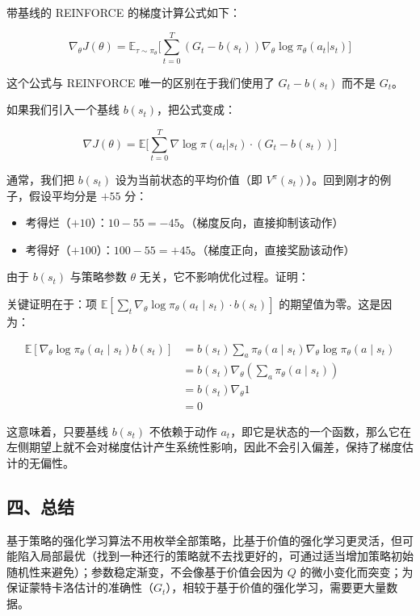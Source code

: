 带基线的 REINFORCE 的梯度计算公式如下：

\[
\nabla_\theta J(\theta)
=\mathbb{E}_{\tau\sim\pi_\theta}
\bigl[
\sum_{t=0}^{T}
(G_t-b(s_t))\nabla_\theta\log\pi_\theta(a_t|s_t)
\bigr]
\]

这个公式与 REINFORCE 唯一的区别在于我们使用了 \(G_t-b(s_t)\) 而不是 \(G_t\)。

如果我们引入一个基线 \(b(s_t)\)，把公式变成：

\[
\nabla J(\theta)
=\mathbb{E}
\bigl[
\sum_{t=0}^{T}
\nabla\log\pi(a_t|s_t)\cdot(G_t-b(s_t))
\bigr]
\]

通常，我们把 \(b(s_t)\) 设为当前状态的平均价值（即 \(V^{\pi}(s_t)\)）。回到刚才的例子，假设平均分是 \(+55\) 分：

\begin{itemize}
\tightlist
\item
  考得烂（\(+10\)）：\(10-55=-45\)。（梯度反向，直接抑制该动作）
\item
  考得好（\(+100\)）：\(100-55=+45\)。（梯度正向，直接奖励该动作）
\end{itemize}

由于 \(b(s_t)\) 与策略参数 \(\theta\) 无关，它不影响优化过程。证明：

关键证明在于：项 \(\mathbb{E}[\sum_t \nabla_\theta \log \pi_\theta(a_t \mid s_t)\cdot b(s_t)]\) 的期望值为零。这是因为：

\[
\begin{aligned}
\mathbb{E}[\nabla_\theta \log \pi_\theta(a_t \mid s_t)b(s_t)]
&= b(s_t)\sum_a \pi_\theta(a \mid s_t)\nabla_\theta \log \pi_\theta(a \mid s_t) \\
&= b(s_t)\nabla_\theta(\sum_a \pi_\theta(a \mid s_t)) \\
&= b(s_t)\nabla_\theta 1 \\
&= 0
\end{aligned}
\]

这意味着，只要基线 \(b(s_t)\) 不依赖于动作 \(a_t\)，即它是状态的一个函数，那么它在左侧期望上就不会对梯度估计产生系统性影响，因此不会引入偏差，保持了梯度估计的无偏性。

\hypertarget{ux56dbux603bux7ed3-1}{%
\subsection{四、总结}\label{ux56dbux603bux7ed3-1}}

基于策略的强化学习算法不用枚举全部策略，比基于价值的强化学习更灵活，但可能陷入局部最优（找到一种还行的策略就不去找更好的，可通过适当增加策略初始随机性来避免）；参数稳定渐变，不会像基于价值会因为 \(Q\) 的微小变化而突变；为保证蒙特卡洛估计的准确性（\(G_t\)），相较于基于价值的强化学习，需要更大量数据。


